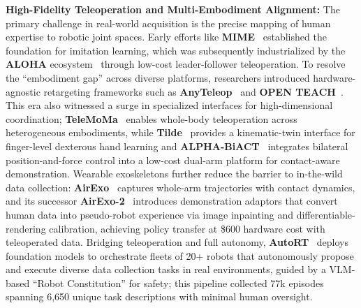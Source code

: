 \documentclass[acmsmall,screen,review,anonymous]{acmart}
\begin{document}
\textbf{High-Fidelity Teleoperation and Multi-Embodiment Alignment:} 
The primary challenge in real-world acquisition is the precise mapping of human expertise to robotic joint spaces. Early efforts like \textbf{MIME}~\cite{sharma2018mime} established the foundation for imitation learning, which was subsequently industrialized by the \textbf{ALOHA} ecosystem~\cite{zhao2023learning, fu2024mobile} through low-cost leader-follower teleoperation. To resolve the ``embodiment gap'' across diverse platforms, researchers introduced hardware-agnostic retargeting frameworks such as \textbf{AnyTeleop}~\cite{qin2024anyteleop} and \textbf{OPEN TEACH}~\cite{iyer2024openteach}. This era also witnessed a surge in specialized interfaces for high-dimensional coordination; \textbf{TeleMoMa}~\cite{dass2024telemoma} enables whole-body teleoperation across heterogeneous embodiments, while \textbf{Tilde}~\cite{si2024tilde} provides a kinematic-twin interface for finger-level dexterous hand learning and \textbf{ALPHA-BiACT}~\cite{alphabiact2024} integrates bilateral position-and-force control into a low-cost dual-arm platform for contact-aware demonstration. Wearable exoskeletons further reduce the barrier to in-the-wild data collection: \textbf{AirExo}~\cite{airexo2024} captures whole-arm trajectories with contact dynamics, and its successor \textbf{AirExo-2}~\cite{fang2025airexo2} introduces demonstration adaptors that convert human data into pseudo-robot experience via image inpainting and differentiable-rendering calibration, achieving policy transfer at \$600 hardware cost with teleoperated data.
Bridging teleoperation and full autonomy, \textbf{AutoRT}~\cite{gdm2024autort} deploys foundation models to orchestrate fleets of 20+ robots that autonomously propose and execute diverse data collection tasks in real environments, guided by a VLM-based ``Robot Constitution'' for safety; this pipeline collected 77k episodes spanning 6,650 unique task descriptions with minimal human oversight.
\end{document}
